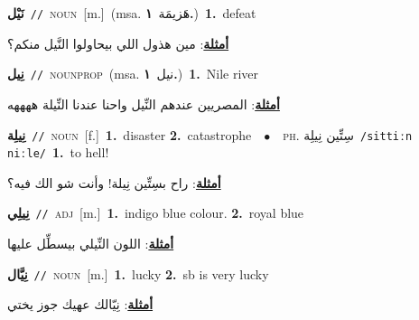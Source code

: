 \documentclass[10pt,a4paper,twoside]{article} %
\begin{document}
\begin{multicols}{2}
{\setlength\topsep{0pt}\textbf{\foreignlanguage{arabic}{نَيْل}}\ {\color{gray}\texttt{//}\color{black}}\ \textsc{noun}\ [m.]\ \color{gray}(msa. \foreignlanguage{arabic}{هَزيمَة}~\foreignlanguage{arabic}{\textbf{١.}})\color{black}\ \textbf{1.}~defeat\  \begin{flushright}\color{gray}\foreignlanguage{arabic}{\textbf{\underline{\foreignlanguage{arabic}{أمثلة}}}: مين هذول اللي بيحاولوا النَّيل منكم؟}\end{flushright}\color{black}} \vspace{2mm}

{\setlength\topsep{0pt}\textbf{\foreignlanguage{arabic}{نِيل}}\ {\color{gray}\texttt{//}\color{black}}\ \textsc{noun\textunderscore prop}\ \color{gray}(msa. \foreignlanguage{arabic}{نيل}~\foreignlanguage{arabic}{\textbf{١.}})\color{black}\ \textbf{1.}~Nile river\  \begin{flushright}\color{gray}\foreignlanguage{arabic}{\textbf{\underline{\foreignlanguage{arabic}{أمثلة}}}: المصريين عندهم النِّيل واحنا عندنا النِّيلة ههههه}\end{flushright}\color{black}} \vspace{2mm}

{\setlength\topsep{0pt}\textbf{\foreignlanguage{arabic}{نِيلِة}}\ {\color{gray}\texttt{//}\color{black}}\ \textsc{noun}\ [f.]\ \textbf{1.}~disaster  \textbf{2.}~catastrophe\ \ $\bullet$\ \ \textsc{ph.} \color{gray} \foreignlanguage{arabic}{سِتِّين نِيلِة}\color{black}\ {\color{gray}\texttt{/{\sffamily sittiːn niːle}/}\color{black}}\ \textbf{1.}~to hell!\  \begin{flushright}\color{gray}\foreignlanguage{arabic}{\textbf{\underline{\foreignlanguage{arabic}{أمثلة}}}: راح بسِتِّين نِيلة! وأنت شو الك فيه؟}\end{flushright}\color{black}} \vspace{2mm}

{\setlength\topsep{0pt}\textbf{\foreignlanguage{arabic}{نِيلِي}}\ {\color{gray}\texttt{//}\color{black}}\ \textsc{adj}\ [m.]\ \textbf{1.}~indigo blue colour.  \textbf{2.}~royal blue\  \begin{flushright}\color{gray}\foreignlanguage{arabic}{\textbf{\underline{\foreignlanguage{arabic}{أمثلة}}}: اللون النِّيلي بيسطِّل عليها}\end{flushright}\color{black}} \vspace{2mm}

{\setlength\topsep{0pt}\textbf{\foreignlanguage{arabic}{نِيَّال}}\ {\color{gray}\texttt{//}\color{black}}\ \textsc{noun}\ [m.]\ \textbf{1.}~lucky  \textbf{2.}~sb is very lucky\  \begin{flushright}\color{gray}\foreignlanguage{arabic}{\textbf{\underline{\foreignlanguage{arabic}{أمثلة}}}: نِيّالك عهيك جوز يختي}\end{flushright}\color{black}} \vspace{2mm}


\end{multicols}
\end{document}

